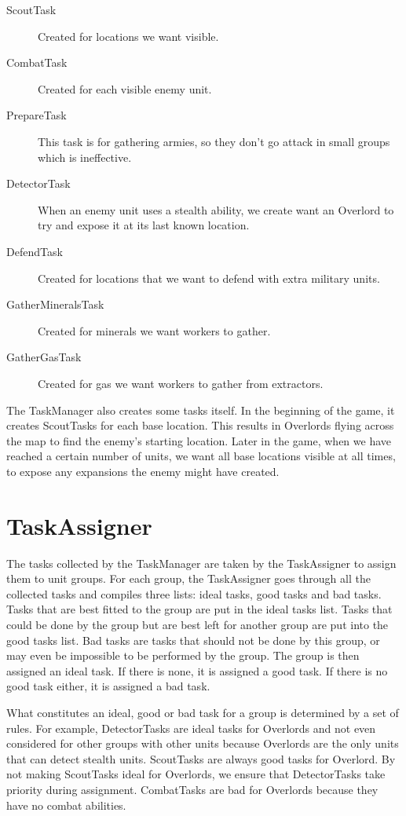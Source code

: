 \begin{description}
\item[ScoutTask] Created for locations we want visible.
\item[CombatTask] Created for each visible enemy unit.
\item[PrepareTask] This task is for gathering armies, so they don't go attack in small groups which is ineffective.
\item[DetectorTask] When an enemy unit uses a stealth ability, we create want an Overlord to try and expose it at its last known location.
\item[DefendTask] Created for locations that we want to defend with extra military units.
\item[GatherMineralsTask] Created for minerals we want workers to gather.
\item[GatherGasTask] Created for gas we want workers to gather from extractors.
\end{description}

The TaskManager also creates some tasks itself. In the beginning of the game, it creates ScoutTasks for each base location. This results in Overlords flying across the map to find the enemy's starting location. Later in the game, when we have reached a certain number of units, we want all base locations visible at all times, to expose any expansions the enemy might have created.

\section{TaskAssigner}

The tasks collected by the TaskManager are taken by the TaskAssigner to assign them to unit groups. For each group, the TaskAssigner goes through all the collected tasks and compiles three lists: ideal tasks, good tasks and bad tasks. Tasks that are best fitted to the group are put in the ideal tasks list. Tasks that could be done by the group but are best left for another group are put into the good tasks list. Bad tasks are tasks that should not be done by this group, or may even be impossible to be performed by the group. The group is then assigned an ideal task. If there is none, it is assigned a good task. If there is no good task either, it is assigned a bad task.

What constitutes an ideal, good or bad task for a group is determined by a set of rules. For example, DetectorTasks are ideal tasks for Overlords and not even considered for other groups with other units because Overlords are the only units that can detect stealth units. ScoutTasks are always good tasks for Overlord. By not making ScoutTasks ideal for Overlords, we ensure that DetectorTasks take priority during assignment. CombatTasks are bad for Overlords because they have no combat abilities.

